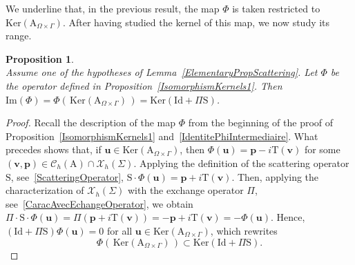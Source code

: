 \documentclass[a4paper,11pt]{article}
\newcommand{\mrm}{\mathrm}
\newcommand{\mA}{\mathrm{A}}
\newcommand{\Id}{\mathrm{Id}}
\newcommand{\mT}{\mathrm{T}}
\newcommand{\mS}{\mathrm{S}}
\newcommand{\bp}{\boldsymbol{p}}
\newcommand{\bu}{\boldsymbol{u}}
\newcommand{\bv}{\boldsymbol{v}}
\newtheorem{prop}[defn]{Proposition}
\begin{document}
We underline that, in the previous result, the map $\Phi$ is taken restricted to $\mrm{Ker}(\mA_{\Omega\times\Gamma})$. After having studied the kernel
of this map, we now study its range.

\begin{prop}\label{IsomorphismKernels2}\quad\\
  Assume one of the hypotheses of Lemma~\ref{ElementaryPropScattering}. 
  Let $\Phi$ be the operator defined in Proposition~\ref{IsomorphismKernels1}. 
  Then $\mrm{Im}(\Phi) = \Phi(\,\mrm{Ker}(\mA_{\Omega\times\Gamma})\,) = \mrm{Ker}(\Id+\Pi\mS)$.
\end{prop}
\begin{proof}
Recall the description of the map $\Phi$ from the beginning of the
proof of Proposition~\ref{IsomorphismKernels1} and~\eqref{IdentitePhiIntermediaire}. What precedes shows that, if $\bu\in
\mrm{Ker}(\mA_{\Omega\times\Gamma})$, then $\Phi(\bu) = \bp-i\mT(\bv)$
for some $(\bv,\bp)\in \mathscr{C}_h(\mA)\cap\mathscr{X}_h(\Sigma)$.
Applying the definition of the scattering operator $\mS$, see~\eqref{ScatteringOperator}, $\mS\cdot\Phi(\bu) =
\bp+i\mT(\bv)$. Then, applying the characterization of $\mathscr{X}_h(\Sigma)$ with the exchange operator
$\Pi$, see~\eqref{CaracAvecEchangeOperator}, we obtain
$\Pi\cdot\mS\cdot\Phi(\bu) = \Pi(\bp+i\mT(\bv)) = -\bp+i\mT(\bv) =
-\Phi(\bu)$. Hence, $(\Id + \Pi\mS)\Phi(\bu) = 0$ for all \(\bu\in
\mrm{Ker}(\mA_{\Omega\times\Gamma})\), which rewrites
\begin{equation*}
  \Phi(\,\mrm{Ker}(\mA_{\Omega\times\Gamma})\,)\subset \mrm{Ker}(\Id + \Pi\mS).
\end{equation*}


\end{proof}
\end{document}
